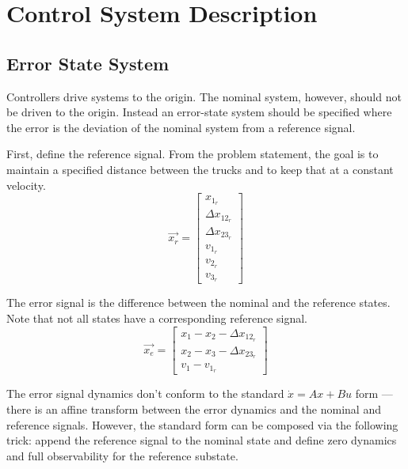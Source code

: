 \documentclass[12pt,onecolumn,reqno]{amsart}
\begin{document}
\section{Control System Description}
\subsection{Error State System}
Controllers drive systems to the origin. The nominal system, however, should not
be driven to the origin. Instead an error-state system should be specified where
the error is the deviation of the nominal system from a reference signal.

First, define the reference signal. From the problem statement, the goal is to
maintain a specified distance between the trucks and to keep that at a constant
velocity.
\begin{equation}
  \vec{x_{r}} = 
  \begin{bmatrix}
    x_{1_{r}}         \\
    \Delta x_{12_{r}} \\
    \Delta x_{23_{r}} \\
    v_{1_{r}}         \\
    v_{2_{r}}         \\
    v_{3_{r}}
  \end{bmatrix}
\end{equation}

The error signal is the difference between the nominal and the reference states.
Note that not all states have a corresponding reference signal.
\begin{equation}
  \vec{x_{e}} = 
  \begin{bmatrix}
    x_{1} - x_{2} - \Delta x_{12_{r}} \\
    x_{2} - x_{3} - \Delta x_{23_{r}} \\
    v_{1} - v_{1_{r}}
  \end{bmatrix}
\end{equation}

The error signal dynamics don't conform to the standard $\dot{x} = Ax + Bu$ form
--- there is an affine transform between the error dynamics and the nominal and
reference signals. However, the standard form can be composed via the following
trick: append the reference signal to the nominal state and define zero dynamics
and full observability for the reference substate.
\end{document}
